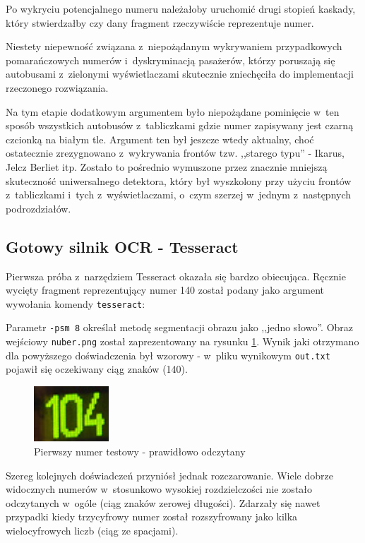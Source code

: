 Po wykryciu potencjalnego numeru należałoby uruchomić drugi stopień
kaskady, który stwierdzałby czy dany fragment rzeczywiście reprezentuje
numer.

Niestety niepewność związana z~niepożądanym wykrywaniem przypadkowych
pomarańczowych numerów i~dyskryminacją pasażerów, którzy
poruszają się autobusami z~zielonymi wyświetlaczami skutecznie
zniechęciła do implementacji rzeczonego rozwiązania.

Na tym etapie dodatkowym argumentem było niepożądane 
pominięcie w~ten sposób
wszystkich autobusów z~tabliczkami gdzie numer zapisywany jest czarną
czcionką na białym tle. Argument ten był jeszcze wtedy aktualny, choć
ostatecznie zrezygnowano z~wykrywania frontów tzw. ,,starego typu'' -
Ikarus, Jelcz Berliet itp. Zostało to pośrednio wymuszone przez 
znacznie mniejszą skuteczność uniwersalnego detektora, który był
wyszkolony przy użyciu frontów z~tabliczkami i~tych z~wyświetlaczami, 
o~czym szerzej w~jednym z~następnych podrozdziałów.

\subsection{Gotowy silnik OCR - Tesseract}

Pierwsza próba z~narzędziem Tesseract okazała się bardzo obiecująca.
Ręcznie wycięty fragment reprezentujący numer 140 został podany 
jako argument wywołania komendy \verb|tesseract|:



Parametr \verb|-psm 8| określał metodę segmentacji obrazu jako ,,jedno
słowo''. Obraz wejściowy \verb|nuber.png| został zaprezentowany
na rysunku \ref{fig:sample_tesseract_input}. Wynik jaki otrzymano dla 
powyższego doświadczenia
był wzorowy - w~pliku wynikowym \verb|out.txt| pojawił
się oczekiwany ciąg znaków (140).

\begin{figure}[h!]
    \centering
    \includegraphics[width=0.25\textwidth]{img/exp_number_01}
    \caption{Pierwszy numer testowy - prawidłowo odczytany}
    \label{fig:sample_tesseract_input}
\end{figure}

Szereg kolejnych doświadczeń przyniósł jednak rozczarowanie. 
Wiele dobrze widocznych numerów w~stosunkowo wysokiej rozdzielczości 
nie zostało odczytanych w~ogóle (ciąg znaków zerowej długości). Zdarzały 
się nawet przypadki kiedy trzycyfrowy numer został rozszyfrowany jako
kilka wielocyfrowych liczb (ciąg ze spacjami).

